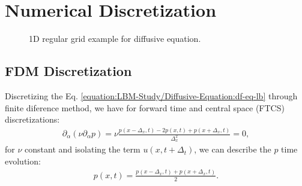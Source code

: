 \documentclass[letterpaper,10pt,english,openany,oneside]{jupyterBook}
\begin{document}
\section{Numerical Discretization}
\label{\detokenize{LBM-Study/Poisson-Equation:numerical-discretization}}
\begin{figure}[htbp]
\centering
\capstart

\noindent{}
\caption{1D regular grid example for diffusive equation.}\label{\detokenize{LBM-Study/Poisson-Equation:mesh-1-diffusive-steady}}\end{figure}


\subsection{FDM Discretization}
\label{\detokenize{LBM-Study/Poisson-Equation:fdm-discretization}}
\sphinxAtStartPar
Discretizing the Eq. \eqref{equation:LBM-Study/Diffusive-Equation:df-eq-lb} through finite diference method, we have for forward time and central space (FTCS) discretizations:
\begin{equation*}
\begin{split}
\partial_{\alpha}\left( \nu \partial_{\alpha}p \right) = \nu\frac{ p(x - \Delta_{x},t) -2p(x,t) + p(x + \Delta_{x},t) }{\Delta_{x}^{2}} =0,
\end{split}
\end{equation*}
\sphinxAtStartPar
for \(\nu\) constant and isolating the term \(u(x,t + \Delta_{t})\), we can describe the \(p\) time evolution:
\begin{equation*}
\begin{split}
p(x,t)   =  \frac{ p(x - \Delta_{x},t) + p(x + \Delta_{x},t) }{2} .
\end{split}
\end{equation*}
\end{document}
